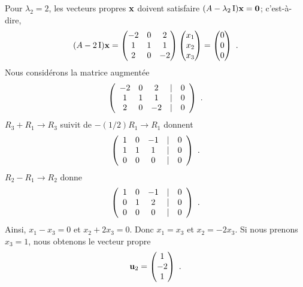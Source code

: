 {Pour $\lambda_2 = 2$, les vecteurs propres $\mathbf{x}$ doivent
satisfaire $(A-\lambda_2\operatorname{I})\mathbf{x} = \mathbf{0}$; c'est-à-dire,
\[
(A-2 \operatorname{I})\mathbf{x} =
\begin{pmatrix} -2 & 0 & 2 \\1 & 1 & 1 \\2 & 0 & -2 \end{pmatrix}
\begin{pmatrix} x_1 \\ x_2 \\ x_3 \end{pmatrix}
= \begin{pmatrix} 0 \\ 0 \\ 0 \end{pmatrix}  \ .
\]
Nous considérons la matrice augmentée
\[
\left(\begin{array}{ccc@{\quad | \quad}c}
-2 & 0 & 2 & 0 \\1 & 1 & 1 & 0 \\2 & 0 & -2 & 0
\end{array}\right) \ .
\]
$R_3+R_1\rightarrow R_3$ suivit de $-(1/2)R_1\rightarrow R_1$ donnent
\[
\left(\begin{array}{ccc@{\quad | \quad}c}
1 & 0 & -1 & 0 \\1 & 1 & 1 & 0 \\0 & 0 & 0 & 0
\end{array}\right) \ .
\]
$R_2-R_1 \rightarrow R_2$ donne
\[
\left(\begin{array}{ccc@{\quad | \quad}c}
1 & 0 & -1 & 0 \\0 & 1 & 2 & 0 \\0 & 0 & 0 & 0
\end{array}\right) \ .
\]
Ainsi, $x_1-x_3=0$ et $x_2+2x_3=0$.  Donc $x_1=x_3$ et $x_2=-2x_3$.  Si
nous prenons $x_3=1$, nous obtenons le vecteur propre
\[
\mathbf{u}_2 = \begin{pmatrix} 1 \\ -2 \\ 1 \end{pmatrix} \ .
\]

}
